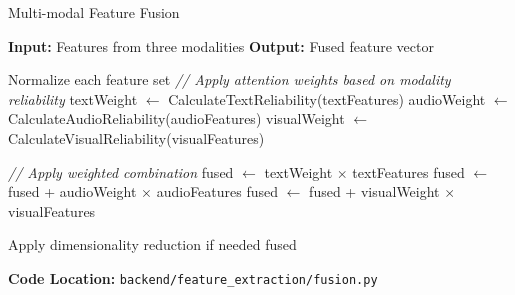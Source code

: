 \documentclass[11pt]{beamer}
\begin{document}
\begin{frame}[fragile]{Multi-modal Feature Fusion}
    \vspace{-0.35cm}
    {\scriptsize
    \begin{algorithm}[H]
    \caption{Multi-modal Feature Fusion}
    \begin{algorithmic}[1]
        \State \textbf{Input:} Features from three modalities
        \State \textbf{Output:} Fused feature vector
        
        \State Normalize each feature set
        \State \textit{// Apply attention weights based on modality reliability}
        \State textWeight $\gets$ CalculateTextReliability(textFeatures)
        \State audioWeight $\gets$ CalculateAudioReliability(audioFeatures)
        \State visualWeight $\gets$ CalculateVisualReliability(visualFeatures)
        
        \State \textit{// Apply weighted combination}
        \State fused $\gets$ textWeight $\times$ textFeatures
        \State fused $\gets$ fused + audioWeight $\times$ audioFeatures
        \State fused $\gets$ fused + visualWeight $\times$ visualFeatures
        
        \State Apply dimensionality reduction if needed
        \State \Return fused
    \EndProcedure
    \end{algorithmic}
    \end{algorithm}
    }
    \vspace{0.05cm}
    \centering
    {\scriptsize \textbf{Code Location:} \texttt{backend/feature\_extraction/fusion.py}}
\end{frame}
\end{document}
